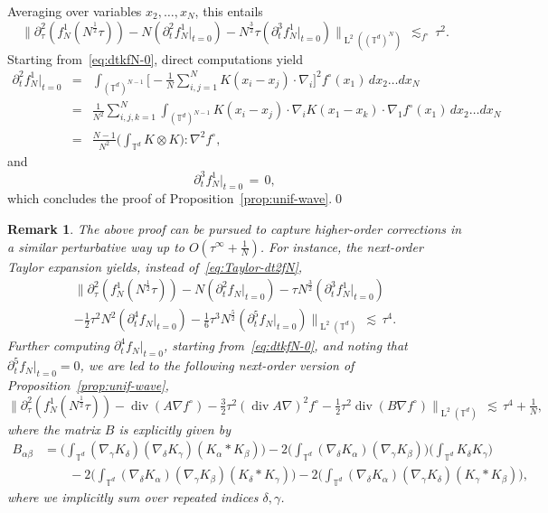\documentclass[a4paper,11pt,reqno,noindent]{amsart}
\theoremstyle{plain}
\newtheorem{rem}[lem]{Remark}
\numberwithin{equation}{section}
\newcommand{\T}{\mathbb T}
\newcommand{\Div}{{\operatorname{div}}}
\newcommand{\3}{|\!|\!|}
\newcommand{\Ld}{\operatorname{L}}
\begin{document}
Averaging over variables $x_2,\ldots,x_N$, this entails
\begin{equation}\label{eq:Taylor-dt2fN}
\big\|\partial_\tau^2(f_N^1(N^{\frac12}\tau))-N(\partial_t^2f_N^1|_{t=0})-N^\frac32\tau(\partial_t^3f_N^1|_{t=0})\big\|_{\Ld^2((\T^d)^N)}\,\lesssim_{f^\circ}\,\tau^2.
\end{equation}
Starting from~\eqref{eq:dtkfN-0}, direct computations yield
\begin{eqnarray*}
\partial_t^2f_N^1|_{t=0}
&=&\int_{(\T^d)^{N-1}}\bigg[-\tfrac1N\sum_{i,j=1}^NK(x_i-x_j)\cdot\nabla_i\bigg]^2f^{\circ}(x_1)\,dx_2\ldots dx_N\\
&=&\tfrac1{N^2}\sum_{i,j,k=1}^N\int_{(\T^d)^{N-1}}K(x_i-x_j)\cdot\nabla_iK(x_1-x_k)\cdot\nabla_1f^{\circ}(x_1)\,dx_2\ldots dx_N\\
&=&\tfrac{N-1}{N^2}\Big(\int_{\T^d}K\otimes K\Big):\nabla^2f^{\circ},
\end{eqnarray*}
and
\[\partial_t^3f_N^1|_{t=0}\,=\,0,\]
which concludes the proof of Proposition~\ref{prop:unif-wave}.\qed

\begin{rem}
The above proof can be pursued to capture higher-order corrections in a similar perturbative way up to $O(\tau^\infty+\frac1N)$. For instance, the next-order Taylor expansion yields, instead of~\eqref{eq:Taylor-dt2fN},
\begin{multline*}
\Big\|\partial_\tau^2(f_N^1(N^{\frac12}\tau))-N(\partial_t^2f_N|_{t=0})-\tau N^\frac32 (\partial_t^3f_N^1|_{t=0})\\
-\tfrac12\tau^2N^2(\partial_t^4f_N|_{t=0})-\tfrac16\tau^3N^\frac52(\partial_t^5f_N|_{t=0})\Big\|_{\Ld^2(\T^d)}\,\lesssim\,\tau^4.
\end{multline*}
Further computing $\partial_t^4f_N|_{t=0}$, starting from~\eqref{eq:dtkfN-0}, and noting that $\partial_t^5f_N|_{t=0}=0$, we are led to the following next-order version of Proposition~\ref{prop:unif-wave},
\[\Big\|\partial_\tau^2(f_N^1(N^{\frac12}\tau))-\Div(A\nabla f^{\circ})-\tfrac32\tau^2(\Div A\nabla)^2f^{\circ}
-\tfrac12\tau^2\Div(B\nabla f^{\circ})\Big\|_{\Ld^2(\T^d)}\,\lesssim\,\tau^4+\tfrac1N,\]
where the matrix $B$ is explicitly given by
\begin{align*}
B_{\alpha\beta}&=\Big(\int_{\T^d}(\nabla_\gamma K_\delta) (\nabla_\delta K_\gamma) (K_\alpha\ast K_\beta)\Big)
-2\Big(\int_{\T^d} (\nabla_\delta K_\alpha)(\nabla_{\gamma}K_\beta)\Big)\Big(\int_{\T^d} K_\delta K_\gamma\Big)\\
&\qquad-2\Big(\int_{\T^d}(\nabla_\delta K_\alpha)(\nabla_\gamma K_\beta)(K_\delta\ast K_\gamma)\Big)
-2\Big(\int_{\T^d}(\nabla_\delta K_\alpha) (\nabla_\gamma K_\delta) (K_\gamma\ast K_\beta)\Big),
\end{align*}
where we implicitly sum over repeated indices $\delta,\gamma$.
\end{rem}
\end{document}
